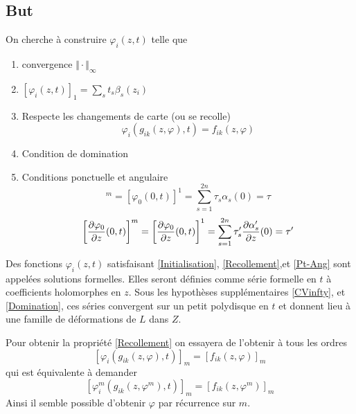 \documentclass[a4paper,10pt,draft]{article}
\begin{document}
\subsection{But}
On cherche à construire $\varphi_i(z,t)$ telle que
\begin{enumerate}
\item convergence $\Vert \cdot \Vert_\infty$ \label{CVinfty}
\item $[\varphi_i(z,t)]_1 = \sum_s t_s \beta_s(z_i)$\label{Initialisation}
\item Respecte les changements de carte (ou se recolle)\label{Recollement}
\begin{equation}
\varphi_i(g_{ik}(z,\varphi),t) = f_{ik}(z, \varphi)
\end{equation}
\item Condition de domination\label{Domination}
\item Conditions ponctuelle et angulaire\label{Pt-Ang}
\begin{equation}
[\varphi_0(0,t)]^m = [\varphi_0(0,t)]^1  = \sum_{s=1}^{2n} \tau_s \alpha_s(0) = \tau
\end{equation}
\begin{equation}
\left[\dfrac{\partial{\varphi_0}}{\partial{z}}(0,t)\right]^m = \left[\dfrac{\partial{\varphi_0}}{\partial{z}}(0,t)\right]^1  = \sum_{s=1}^{2n} \tau'_s \dfrac{\partial{\alpha'_s}}{\partial{z}}(0) = \tau'
\end{equation}
\end{enumerate}

Des fonctions $\varphi_i(z,t)$ satisfaisant \eqref{Initialisation}, \eqref{Recollement},et \eqref{Pt-Ang} sont appelées solutions formelles. Elles seront définies comme série formelle en $t$ à coefficients holomorphes en $z$. Sous les hypothèses supplémentaires \eqref{CVinfty}, et \eqref{Domination}, ces séries convergent sur un petit polydisque en $t$ et donnent lieu à une famille de déformations de $L$ dans $Z$.

Pour obtenir la propriété \eqref{Recollement} on essayera de l'obtenir à tous les ordres
\begin{equation}\label{Recollement_m}
\left[\varphi_i(g_{ik}(z,\varphi),t)\right]_m = \left[f_{ik}(z, \varphi)\right]_m
\end{equation}
qui est équivalente à demander
\begin{equation}\label{recollement_m}
\left[\varphi^m_i(g_{ik}(z,\varphi^m),t)\right]_m = \left[f_{ik}(z, \varphi^m)\right]_m
\end{equation}
Ainsi il semble possible d'obtenir $\varphi$ par récurrence sur $m$.
\end{document}
